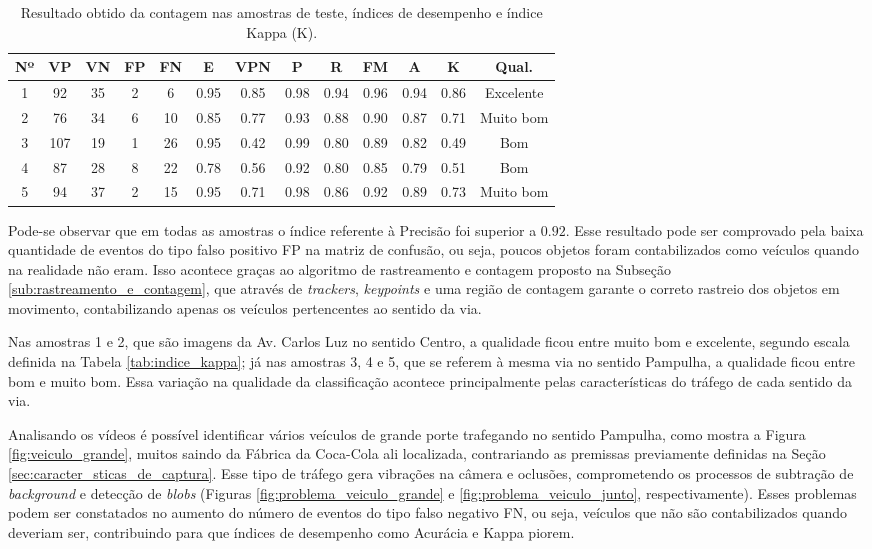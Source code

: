 \begin{table}[ht]
  \caption{Resultado obtido da contagem nas amostras de teste, índices de desempenho e índice Kappa (K).}
  \label{tab:matrix_result}
  \begin{center}
    \begin{tabular}{c|cccc|cccccc|cc}
    \toprule
    \textbf{Nº} & \textbf{VP} & \textbf{VN} & \textbf{FP} & \textbf{FN} & \textbf{E} & \textbf{VPN} & \textbf{P} & \textbf{R} & \textbf{FM} & \textbf{A} & \textbf{K} & \textbf{Qual.} \\
    \midrule
      1 & 92 & 35 & 2 & 6 & 0.95 & 0.85 & 0.98 & 0.94 & 0.96 & 0.94 & 0.86 & Excelente\\
      2 & 76 & 34 & 6 & 10 & 0.85 & 0.77 & 0.93 & 0.88 & 0.90 & 0.87 & 0.71 & Muito bom\\
      3 & 107 & 19 & 1 & 26 & 0.95 & 0.42 & 0.99 & 0.80 & 0.89 & 0.82 & 0.49 & Bom \\
      4 & 87 & 28 & 8 & 22 & 0.78 & 0.56 & 0.92 & 0.80 & 0.85 & 0.79 & 0.51 & Bom \\
      5 & 94 & 37 & 2 & 15 & 0.95 & 0.71 & 0.98 & 0.86 & 0.92 & 0.89 & 0.73 & Muito bom\\
    \bottomrule
    \end{tabular}
  \end{center}
\end{table}

Pode-se observar que em todas as amostras o índice referente à Precisão foi superior a $0.92$. Esse resultado pode ser comprovado pela baixa quantidade de eventos do tipo falso positivo FP na matriz de confusão, ou seja, poucos objetos foram contabilizados como veículos quando na realidade não eram. Isso acontece graças ao algoritmo de rastreamento e contagem proposto na Subseção \ref{sub:rastreamento_e_contagem}, que através de \textit{trackers}, \textit{keypoints} e uma região de contagem garante o correto rastreio dos objetos em movimento, contabilizando apenas os veículos pertencentes ao sentido da via. 

Nas amostras 1 e 2, que são imagens da Av. Carlos Luz no sentido Centro, a qualidade ficou entre muito bom e excelente, segundo escala definida na Tabela \ref{tab:indice_kappa}; já  nas amostras 3, 4 e 5, que se referem à mesma via no sentido Pampulha, a qualidade ficou entre bom e muito bom. Essa variação na qualidade da classificação acontece principalmente pelas características do tráfego de cada sentido da via. 

Analisando os vídeos é possível identificar vários veículos de grande porte trafegando no sentido Pampulha, como mostra a Figura \ref{fig:veiculo_grande}, muitos saindo da Fábrica da Coca-Cola ali localizada, contrariando as premissas previamente definidas na Seção \ref{sec:caracter_sticas_de_captura}. Esse tipo de tráfego gera vibrações na câmera e oclusões, comprometendo os processos de subtração de \textit{background} e detecção de \textit{blobs} (Figuras \ref{fig:problema_veiculo_grande} e \ref{fig:problema_veiculo_junto}, respectivamente). Esses problemas podem ser constatados no aumento do número de eventos do tipo falso negativo FN, ou seja, veículos que não são contabilizados quando deveriam ser, contribuindo para que índices de desempenho como Acurácia e Kappa piorem.

